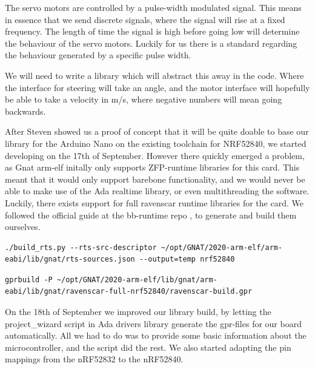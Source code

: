 \documentclass{article}
\begin{document}
The servo motors are controlled by a pulse-width modulated signal. This means in essence that we send discrete signals, where the signal will rise at a fixed frequency. The length of time the signal is high before going low will determine the behaviour of the servo motors. Luckily for us there is a standard regarding the behaviour generated by a specific pulse width.

We will need to write a library which will abstract this away in the code. Where the interface for steering will take an angle, and the motor interface will hopefully be able to take a velocity in m/s, where negative numbers will mean going backwards.

\vspace{5mm}
After Steven showed us a proof of concept that it will be quite doable to base our library for the Arduino Nano on the existing toolchain for NRF52840, we started developing on the 17th of September. However there quickly emerged a problem, as Gnat arm-elf initally only supports ZFP-runtime libraries for this card. This meant that it would only support barebone functionality, and we would never be able to make use of the Ada realtime library, or even multithreading the software. Luckily, there exists support for full ravenscar runtime libraries for the card. We followed the official guide at the bb-runtime repo \cite{BBRUNTIMES}, to generate and build them ourselves.


\begin{lstlisting}
./build_rts.py --rts-src-descriptor ~/opt/GNAT/2020-arm-elf/arm-eabi/lib/gnat/rts-sources.json --output=temp nrf52840
\end{lstlisting}

\begin{lstlisting}
gprbuild -P ~/opt/GNAT/2020-arm-elf/lib/gnat/arm-eabi/lib/gnat/ravenscar-full-nrf52840/ravenscar-build.gpr
\end{lstlisting}


\vspace{5mm}
On the 18th of September we improved our library build, by letting the project\_wizard script in Ada drivers library generate the gpr-files for our board automatically. All we had to do was to provide some basic information about the microcontroller, and the script did the rest. We also started adapting the pin mappings from the nRF52832 to the nRF52840.
\end{document}

